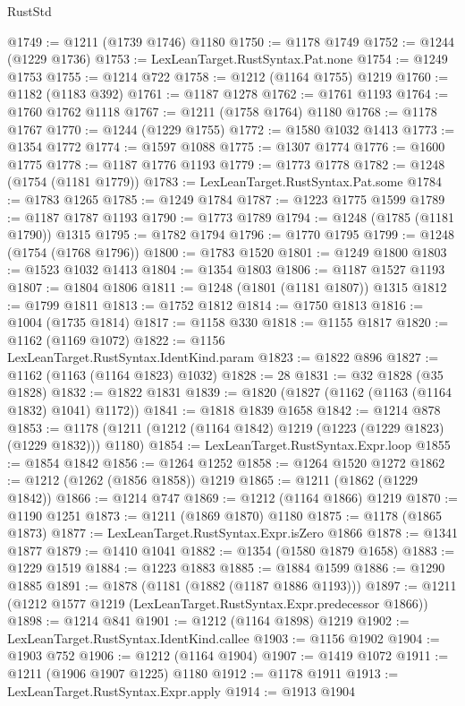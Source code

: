\begin{lexlean}{RustStd}
\begin{coremodule}
@1749 := @1211 (@1739 @1746) @1180
@1750 := @1178 @1749
@1752 := @1244 (@1229 @1736)
@1753 := LexLeanTarget.RustSyntax.Pat.none
@1754 := @1249 @1753
@1755 := @1214 @722
@1758 := @1212 (@1164 @1755) @1219
@1760 := @1182 (@1183 @392)
@1761 := @1187 @1278
@1762 := @1761 @1193
@1764 := @1760 @1762 @1118
@1767 := @1211 (@1758 @1764) @1180
@1768 := @1178 @1767
@1770 := @1244 (@1229 @1755)
@1772 := @1580 @1032 @1413
@1773 := @1354 @1772
@1774 := @1597 @1088
@1775 := @1307 @1774
@1776 := @1600 @1775
@1778 := @1187 @1776 @1193
@1779 := @1773 @1778
@1782 := @1248 (@1754 (@1181 @1779))
@1783 := LexLeanTarget.RustSyntax.Pat.some
@1784 := @1783 @1265
@1785 := @1249 @1784
@1787 := @1223 @1775 @1599
@1789 := @1187 @1787 @1193
@1790 := @1773 @1789
@1794 := @1248 (@1785 (@1181 @1790)) @1315
@1795 := @1782 @1794
@1796 := @1770 @1795
@1799 := @1248 (@1754 (@1768 @1796))
@1800 := @1783 @1520
@1801 := @1249 @1800
@1803 := @1523 @1032 @1413
@1804 := @1354 @1803
@1806 := @1187 @1527 @1193
@1807 := @1804 @1806
@1811 := @1248 (@1801 (@1181 @1807)) @1315
@1812 := @1799 @1811
@1813 := @1752 @1812
@1814 := @1750 @1813
@1816 := @1004 (@1735 @1814)
@1817 := @1158 @330
@1818 := @1155 @1817
@1820 := @1162 (@1169 @1072)
@1822 := @1156 LexLeanTarget.RustSyntax.IdentKind.param
@1823 := @1822 @896
@1827 := @1162 (@1163 (@1164 @1823) @1032)
@1828 := 28
@1831 := @32 @1828 (@35 @1828)
@1832 := @1822 @1831
@1839 := @1820 (@1827 (@1162 (@1163 (@1164 @1832) @1041) @1172))
@1841 := @1818 @1839 @1658
@1842 := @1214 @878
@1853 := @1178 (@1211 (@1212 (@1164 @1842) @1219 (@1223 (@1229 @1823) (@1229 @1832))) @1180)
@1854 := LexLeanTarget.RustSyntax.Expr.loop
@1855 := @1854 @1842
@1856 := @1264 @1252
@1858 := @1264 @1520 @1272
@1862 := @1212 (@1262 (@1856 @1858)) @1219
@1865 := @1211 (@1862 (@1229 @1842))
@1866 := @1214 @747
@1869 := @1212 (@1164 @1866) @1219
@1870 := @1190 @1251
@1873 := @1211 (@1869 @1870) @1180
@1875 := @1178 (@1865 @1873)
@1877 := LexLeanTarget.RustSyntax.Expr.isZero @1866
@1878 := @1341 @1877
@1879 := @1410 @1041
@1882 := @1354 (@1580 @1879 @1658)
@1883 := @1229 @1519
@1884 := @1223 @1883
@1885 := @1884 @1599
@1886 := @1290 @1885
@1891 := @1878 (@1181 (@1882 (@1187 @1886 @1193)))
@1897 := @1211 (@1212 @1577 @1219 (LexLeanTarget.RustSyntax.Expr.predecessor @1866))
@1898 := @1214 @841
@1901 := @1212 (@1164 @1898) @1219
@1902 := LexLeanTarget.RustSyntax.IdentKind.callee
@1903 := @1156 @1902
@1904 := @1903 @752
@1906 := @1212 (@1164 @1904)
@1907 := @1419 @1072
@1911 := @1211 (@1906 @1907 @1225) @1180
@1912 := @1178 @1911
@1913 := LexLeanTarget.RustSyntax.Expr.apply
@1914 := @1913 @1904

\end{coremodule}
\end{lexlean}
